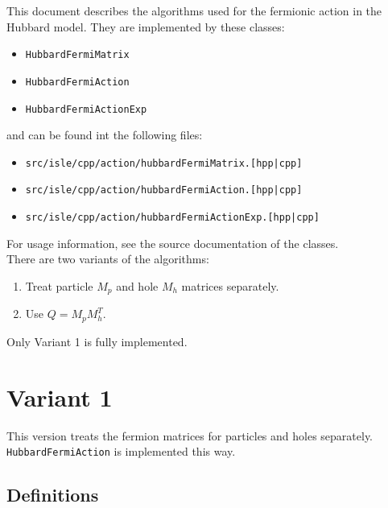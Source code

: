 \documentclass[a4paper, fleqn, twoside, notitlepage]{scrartcl}
\begin{document}
\maketitle
\vspace{-3em}
\tableofcontents

\vfill
\vspace{1em}
\noindent
This document describes the algorithms used for the fermionic action in the Hubbard model.
They are implemented by these classes:
\begin{itemize}
\item \texttt{HubbardFermiMatrix}
\item \texttt{HubbardFermiAction}
\item \texttt{HubbardFermiActionExp}
\end{itemize}
and can be found int the following files:
\begin{itemize}
\item \texttt{src/isle/cpp/action/hubbardFermiMatrix.[hpp|cpp]}
\item \texttt{src/isle/cpp/action/hubbardFermiAction.[hpp|cpp]}
\item \texttt{src/isle/cpp/action/hubbardFermiActionExp.[hpp|cpp]}
\end{itemize}
For usage information, see the source documentation of the classes.\\

\noindent
There are two variants of the algorithms:
\begin{enumerate}
\item Treat particle $M_p$ and hole $M_h$ matrices separately.
\item Use $Q = M_p M_h^T$.
\end{enumerate}
Only Variant 1 is fully implemented.

\clearpage
\section{Variant 1}\label{sec:variant1}

This version treats the fermion matrices for particles and holes separately.
\texttt{HubbardFermiAction} is implemented this way.

\subsection{Definitions}
\end{document}
